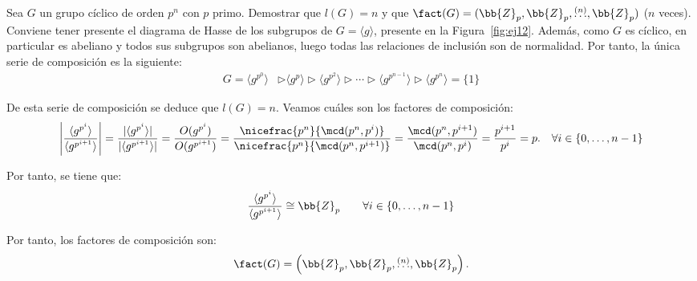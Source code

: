 \begin{ejercicio}\label{ej:5.8}
    Sea $G$ un grupo cíclico de orden $p^n$ con $p$ primo. Demostrar que $l(G) = n$ y que $\fact(G) = (\bb{Z}_p, \bb{Z}_p, \stackrel{(n)}{\ldots}, \bb{Z}_p)$ ($n$ veces).\\

    Conviene tener presente el diagrama de Hasse de los subgrupos de $G=\langle g\rangle$, presente en la Figura~\ref{fig:ej12}. Además, como $G$ es cíclico, en particular es abeliano y todos sus subgrupos son abelianos, luego todas las relaciones de inclusión son de normalidad. Por tanto, la única serie de composición es la siguiente:
    \begin{align*}
        G=\langle g^{p^0}\rangle &\rhd \langle g^{p} \rangle \rhd \langle g^{p^2} \rangle \rhd \cdots \rhd \langle g^{p^{n-1}} \rangle \rhd \langle g^{p^n} \rangle = \{1\}
    \end{align*}

    De esta serie de composición se deduce que $l(G)=n$. Veamos cuáles son los factores de composición:
    \begin{equation*}
        \left|\dfrac{\langle g^{p^i} \rangle}{\langle g^{p^{i+1}} \rangle}\right| = \dfrac{|\langle g^{p^i} \rangle|}{|\langle g^{p^{i+1}} \rangle|} = \dfrac{O(g^{p^i})}{O(g^{p^{i+1}})} = \dfrac{\nicefrac{p^n}{\mcd(p^n, p^i)}}{\nicefrac{p^n}{\mcd(p^n, p^{i+1})}} = \dfrac{\mcd(p^n, p^{i+1})}{\mcd(p^n, p^i)} = \dfrac{p^{i+1}}{p^i} = p.\quad \forall i\in\{0,\ldots,n-1\}
    \end{equation*}

    Por tanto, se tiene que:
    \begin{equation*}
        \dfrac{\langle g^{p^i} \rangle}{\langle g^{p^{i+1}} \rangle} \cong \bb{Z}_p\qquad \forall i\in\{0,\ldots,n-1\}
    \end{equation*}

    Por tanto, los factores de composición son:
    \begin{equation*}
        \fact(G) = \left(\bb{Z}_p, \bb{Z}_p, \stackrel{(n)}{\ldots}, \bb{Z}_p\right).
    \end{equation*}
\end{ejercicio}


